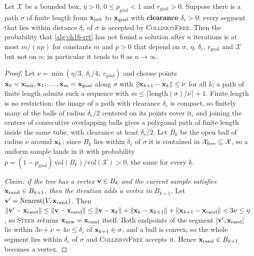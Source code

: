 \begin{theorem}
\label{thm:ch16-complete}
Let $\mathcal{X}$ be a bounded box, $\eta>0$, $0\le p_{\mathrm{goal}}<1$ and
$r_{\mathrm{goal}}>0$. Suppose there is a path $\sigma$ of finite length from
$\mathbf{x}_{\mathrm{init}}$ to $\mathbf{x}_{\mathrm{goal}}$ with \textbf{clearance}
$\delta_{c}>0$: every segment that lies within distance $\delta_{c}$ of $\sigma$
is accepted by \textup{\textsc{CollisionFree}}. Then the probability that
\cref{alg:ch16-rrt} has not found a solution after $n$ iterations is at most
$m/(np)$ for constants $m$ and $p>0$ that depend on $\sigma$, $\eta$,
$\delta_{c}$, $r_{\mathrm{goal}}$ and $\mathcal{X}$ but not on $n$; in
particular it tends to $0$ as $n\to\infty$.
\end{theorem}
\begin{proof}
Let $\nu=\min(\eta/3,\ \delta_{c}/4,\ r_{\mathrm{goal}})$ and choose points
$\mathbf{x}_0=\mathbf{x}_{\mathrm{init}},\mathbf{x}_1,\dots,\mathbf{x}_m=\mathbf{x}_{\mathrm{goal}}$ along $\sigma$ with
$\left\lVert \mathbf{x}_{k+1}-\mathbf{x}_k \right\rVert\le\nu$ for all $k$; a path of finite length admits such a
sequence with $m\le\lceil\mathrm{length}(\sigma)/\nu\rceil+1$. Finite length
is no restriction: the image of a path with clearance $\delta_{c}$ is
compact, so finitely many of the balls of radius $\delta_{c}/2$ centered on
its points cover it, and joining the centers of consecutive overlapping
balls gives a polygonal path of finite length inside the same tube, with
clearance at least $\delta_{c}/2$. Let
$B_k$ be the open ball of radius $\nu$ around $\mathbf{x}_k$; since $B_k$ lies within
$\delta_{c}$ of $\sigma$ it is contained in $\mathcal{X}_{\mathrm{free}}\subseteq\mathcal{X}$, so a
uniform sample lands in it with probability
$p=(1-p_{\mathrm{goal}})\,\mathrm{vol}(B_k)/\mathrm{vol}(\mathcal{X})>0$,
the same for every $k$.

\emph{Claim: if the tree has a vertex $\mathbf{v}\in B_k$ and the current sample
satisfies $\mathbf{x}_{\mathrm{rand}}\in B_{k+1}$, then the iteration adds a vertex in
$B_{k+1}$.} Let $\mathbf{v}'=\operatorname{Nearest}(V,\mathbf{x}_{\mathrm{rand}})$. Then
$\left\lVert \mathbf{v}'-\mathbf{x}_{\mathrm{rand}} \right\rVert\le\left\lVert \mathbf{v}-\mathbf{x}_{\mathrm{rand}} \right\rVert
\le\left\lVert \mathbf{v}-\mathbf{x}_k \right\rVert+\left\lVert \mathbf{x}_k-\mathbf{x}_{k+1} \right\rVert+\left\lVert \mathbf{x}_{k+1}-\mathbf{x}_{\mathrm{rand}} \right\rVert<3\nu\le\eta$,
so \textsc{Steer} returns $\mathbf{x}_{\mathrm{new}}=\mathbf{x}_{\mathrm{rand}}$ itself. Both
endpoints of the segment $[\mathbf{v}',\mathbf{x}_{\mathrm{rand}}]$ lie within
$3\nu+\nu=4\nu\le\delta_{c}$ of $\mathbf{x}_{k+1}\in\sigma$, and a ball is convex, so the
whole segment lies within $\delta_{c}$ of $\sigma$ and \textsc{CollisionFree}
accepts it. Hence $\mathbf{x}_{\mathrm{rand}}\in B_{k+1}$ becomes a vertex.


\end{proof}
